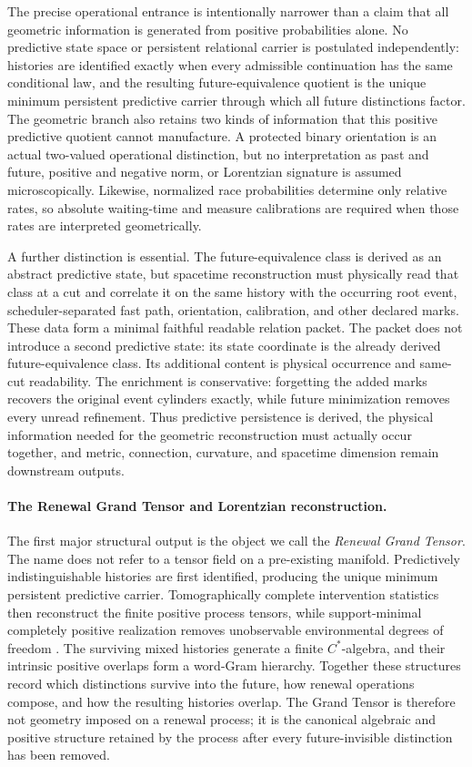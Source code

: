 \documentclass[11pt]{article}
\theoremstyle{definition}
\theoremstyle{remark}
\begin{document}
The precise operational entrance is intentionally narrower than a claim that
all geometric information is generated from positive probabilities alone.
No predictive state space or persistent relational carrier is postulated
independently: histories are identified exactly when every admissible
continuation has the same conditional law, and the resulting
future-equivalence quotient is the unique minimum persistent predictive
carrier through which all future distinctions factor.  The geometric branch
also retains two kinds of information that this positive predictive quotient
cannot manufacture.  A protected binary orientation is an actual two-valued
operational distinction, but no interpretation as past and future,
positive and negative norm, or Lorentzian signature is assumed microscopically.
Likewise, normalized race probabilities determine only relative rates, so
absolute waiting-time and measure calibrations are required when those rates
are interpreted geometrically.

A further distinction is essential.  The future-equivalence class is derived
as an abstract predictive state, but spacetime reconstruction must physically
read that class at a cut and correlate it on the same history with the
occurring root event, scheduler-separated fast path, orientation, calibration,
and other declared marks.  These data form a minimal faithful readable relation
packet.  The packet does not introduce a second predictive state: its state
coordinate is the already derived future-equivalence class.  Its additional
content is physical occurrence and same-cut readability.  The enrichment is
conservative: forgetting the added marks recovers the original event cylinders
exactly, while future minimization removes every unread refinement.  Thus
predictive persistence is derived, the physical information needed for the
geometric reconstruction must actually occur together, and metric, connection,
curvature, and spacetime dimension remain downstream outputs.

\paragraph{The Renewal Grand Tensor and Lorentzian reconstruction.}
The first major structural output is the object we call the
\emph{Renewal Grand Tensor}.  The name does not refer to a tensor field on a
pre-existing manifold.  Predictively indistinguishable histories are first
identified, producing the unique minimum persistent predictive carrier.
Tomographically complete intervention statistics then reconstruct the finite
positive process tensors, while support-minimal completely positive
realization removes unobservable environmental degrees of freedom
\cite{Stinespring1955,Choi1975}.  The surviving mixed histories generate a
finite $C^*$-algebra, and their intrinsic positive overlaps form a word-Gram
hierarchy.  Together these structures record which distinctions survive into
the future, how renewal operations compose, and how the resulting histories
overlap.  The Grand Tensor is therefore not geometry imposed on a renewal
process; it is the canonical algebraic and positive structure retained by the
process after every future-invisible distinction has been removed.
\end{document}
